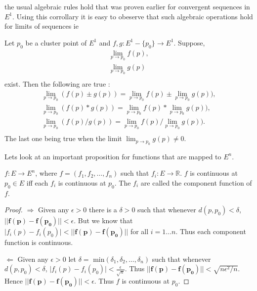 the usual algebraic rules hold that was proven earlier for convergent sequences in $E^1$. Using this
corrollary it is easy to obeserve that such algebraic operations hold for limits of sequences ie 
\begin{Corollary}
    Let $p_0$ be a cluster point of $E^1$ and $f,g : E^1 - \lbrace p_0 \rbrace \to E^1$. Suppose,
    \begin{displaymath}
	\begin{aligned}
	    \lim_{p \to p_0} f(p), \\
	    \lim_{p \to p_0} g(p) \\
	\end{aligned}
    \end{displaymath}
    exist. Then the following are true : 
    \begin{displaymath}
	\begin{aligned}
	    \lim_{p \to p_0} (f(p) \pm g(p))  =  \lim_{p \to p_0} f(p) \pm \lim_{p \to p_0} g(p)), \\
	    \lim_{p \to p_0} (f(p) * g(p)) = \lim_{p \to p_0} f(p) * \lim_{p \to p_0} g(p)), \\
	    \lim_{p \to p_0} (f(p) / g(p)) = \lim_{p \to p_0} f(p) / \lim_{p \to p_0} g(p)).\\
	\end{aligned}
    \end{displaymath}
    The last one being true when the limit $\lim_{p \to p_0} g(p) \neq 0 $.
\end{Corollary}
Lets look at an important proposition for functions that are mapped to $E^n$.
\begin{Proposition}
    $f : E \to E^n$, where $f = \left(f_1,f_2,\dots,f_n\right)$ such that $f_i : E \to \mathbb{R}$.
    $f$ is continuous at $p_0 \in E$ iff each $f_i$ is continuous at $p_0$. The $f_i$ are called the
    component function of $f$.
\end{Proposition}
\begin{proof}
    $\Rightarrow$ Given any $\epsilon > 0$ there is a $\delta > 0$ such that whenever $d(p,p_0) <
    \delta$, $\lvert \lvert \mathbf{f(p)} - \mathbf{f(p_0)} \rvert \rvert < \epsilon$. But we know that
    $\lvert f_i(p) - f_i(p_0) \rvert < \lvert \lvert \mathbf{f(p)} - \mathbf{f(p_0)} \rvert \rvert $ for
    all $i = 1 \dots n$. Thus each component function is continuous. 

    $\Leftarrow$ Given any $\epsilon > 0$ let $\delta = \text{ min}(\delta_1,\delta_2, \dots, \delta_n)$
    such that whenever $d(p,p_0) < \delta$, $\lvert f_i(p) - f_i(p_0) \rvert <
    \frac{\epsilon}{\sqrt{n}}$. Thus $\lvert \lvert \mathbf{f(p)} - \mathbf{f(p_0)} \rvert \rvert <
    \sqrt{n\epsilon ^2/n}$. Hence $\lvert \lvert \mathbf{f(p)} - \mathbf{f(p_0)} \rvert \rvert <
    \epsilon$. Thus $f$ is continuous at $p_0$.
\end{proof}

